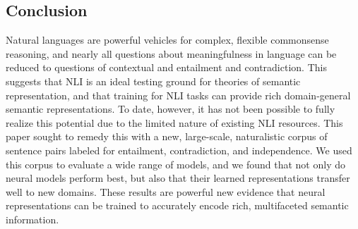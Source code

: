 \subsection{Conclusion}\label{sec:conclusion}

Natural languages are powerful vehicles for complex, flexible
commonsense reasoning, and nearly all questions about meaningfulness
in language can be reduced to questions of contextual and entailment
and contradiction. This suggests that NLI is an ideal testing ground
for theories of semantic representation, and that training for NLI
tasks can provide rich domain-general semantic representations.  To
date, however, it has not been possible to fully realize this
potential due to the limited nature of existing NLI resources.  This
paper sought to remedy this with a new, large-scale, naturalistic
corpus of sentence pairs labeled for entailment, contradiction, and
independence. We used this corpus to evaluate a wide range of models,
and we found that not only do neural models perform best, but also
that their learned representations transfer well to new domains.
These results are powerful new evidence that neural representations
can be trained to accurately encode rich, multifaceted semantic
information.
